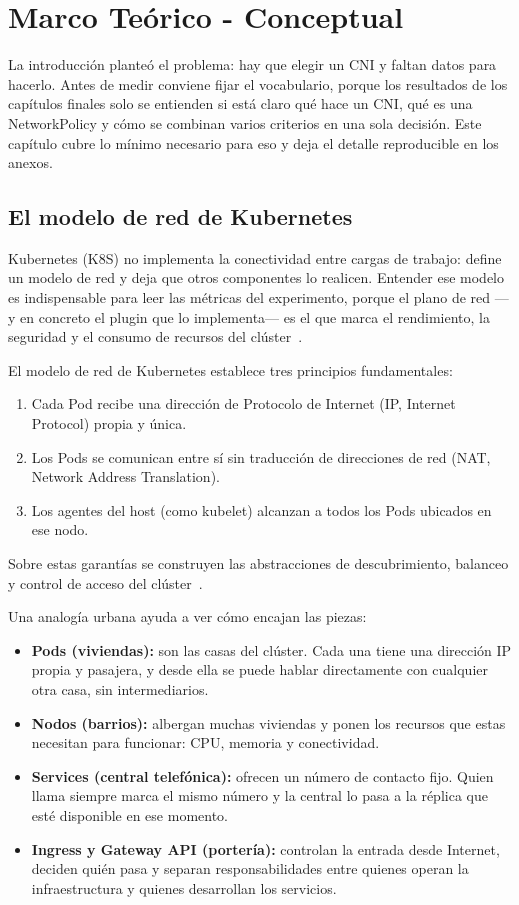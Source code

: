 \chapter{Marco Teórico - Conceptual} \label{cap:marco_teorico}

La introducción planteó el problema: hay que elegir un CNI y faltan datos para hacerlo. Antes de medir conviene fijar el vocabulario, porque los resultados de los capítulos finales solo se entienden si está claro qué hace un CNI, qué es una NetworkPolicy y cómo se combinan varios criterios en una sola decisión. Este capítulo cubre lo mínimo necesario para eso y deja el detalle reproducible en los anexos.

\section{El modelo de red de Kubernetes}

Kubernetes (K8S) no implementa la conectividad entre cargas de trabajo: define un modelo de red y deja que otros componentes lo realicen. Entender ese modelo es indispensable para leer las métricas del experimento, porque el plano de red ---y en concreto el plugin que lo implementa--- es el que marca el rendimiento, la seguridad y el consumo de recursos del clúster~\cite{ref2}.

El modelo de red de Kubernetes establece tres principios fundamentales:
\begin{enumerate}
    \item Cada Pod recibe una dirección de Protocolo de Internet (IP, Internet Protocol) propia y única.
    \item Los Pods se comunican entre sí sin traducción de direcciones de red (NAT, Network Address Translation).
    \item Los agentes del host (como kubelet) alcanzan a todos los Pods ubicados en ese nodo.
\end{enumerate}
Sobre estas garantías se construyen las abstracciones de descubrimiento, balanceo y control de acceso del clúster~\cite{ref2}.

Una analogía urbana ayuda a ver cómo encajan las piezas:
\begin{itemize}
    \item \textbf{Pods (viviendas):} son las casas del clúster. Cada una tiene una dirección IP propia y pasajera, y desde ella se puede hablar directamente con cualquier otra casa, sin intermediarios.
    \item \textbf{Nodos (barrios):} albergan muchas viviendas y ponen los recursos que estas necesitan para funcionar: CPU, memoria y conectividad.
    \item \textbf{Services (central telefónica):} ofrecen un número de contacto fijo. Quien llama siempre marca el mismo número y la central lo pasa a la réplica que esté disponible en ese momento.
    \item \textbf{Ingress y Gateway API (portería):} controlan la entrada desde Internet, deciden quién pasa y separan responsabilidades entre quienes operan la infraestructura y quienes desarrollan los servicios.
\end{itemize}

